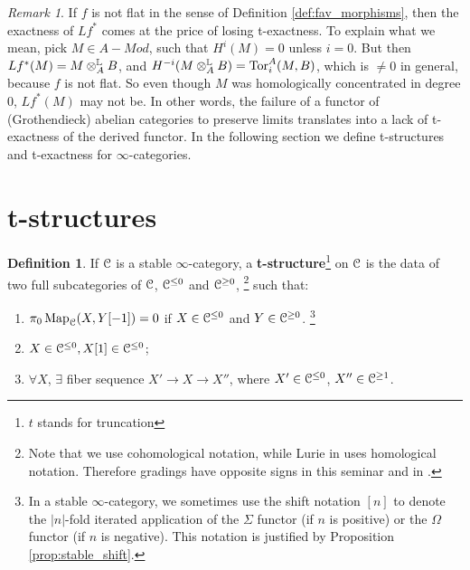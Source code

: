 \documentclass[10pt,a4paper,reqno,oneside]{book} %
\theoremstyle{plain}
\theoremstyle{definition}
\newtheorem{defin}[thm]{Definition}
\theoremstyle{remark}
\newtheorem{rem}[thm]{Remark}
\numberwithin{equation}{section}
\begin{document}
\begin{rem}
\label{rem:exact_t}
If $f$ is not flat in the sense of Definition \ref{def:fav_morphisms}, then the exactness of
$Lf^*$ comes at the price of losing t-exactness. To explain what we mean, pick $M \in A-Mod$, such that
$H^i(M) = 0$ unless $i = 0$. But then $Lf^*(M) = M \otimes_A^{\mathbb L} B$, and $H^{-i}(M\otimes_A^{\mathbb L}B) = \mathrm{Tor}_i^A(M,B)$, which
is $\neq 0$ in general, because $f$ is not flat. So even though $M$ was homologically concentrated in degree 0, $Lf^*(M)$ may
not be. In other words, the failure of a functor of (Grothendieck) abelian categories to preserve limits translates into a lack 
of t-exactness of the derived functor. In the following section we define t-structures and t-exactness for $\infty$-categories.
\end{rem}


\section{t-structures}
\label{sect:t-struct}

\begin{defin}
If $\mathcal C$ is a stable $\infty$-category, a \textbf{t-structure}\footnote{$t$ stands for truncation} on 
$\mathcal C$ is the data of two full subcategories of $\mathcal C$, $\mathcal C^{\leq 0}$ and
$\mathcal C^{\geq 0}$, \footnote{Note that we use cohomological notation, while Lurie in \cite{Lurie_Higher_algebra} uses homological
notation. Therefore gradings have opposite signs in this seminar and in \cite{Lurie_Higher_algebra}.} such that:

\begin{enumerate}
\item \label{item:no_morph_right}
$\pi_0 \operatorname{Map}_{\mathcal C}(X,Y[-1]) = 0$ if $X \in \mathcal C^{\leq 0}$ and $Y \in \mathcal C^{\geq 0}$.
\footnote{In a stable $\infty$-category, we sometimes use the shift notation $[n]$ to denote the $|n|$-fold iterated application
of the $\Sigma$ functor (if $n$ is positive) or the $\Omega$ functor (if $n$ is negative). This notation is justified by
Proposition \ref{prop:stable_shift}.}

\item $X \in \mathcal C^{\leq 0}, X[1]  \in \mathcal C^{\leq 0}$;

\item \label{item:fiber_seq}
$\forall X$, $\exists$ fiber sequence $X' \to X \to X''$, where $X' \in \mathcal C^{\leq 0}$, $X'' \in \mathcal C^{\geq 1}$.
\end{enumerate}
\end{defin}
\end{document}
